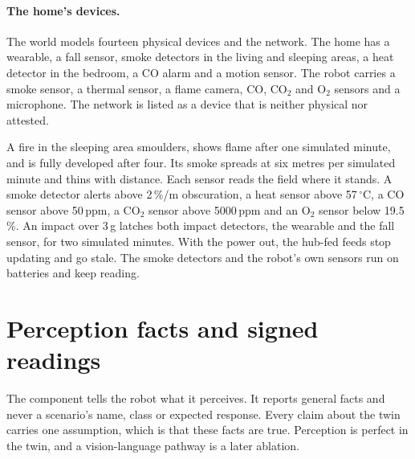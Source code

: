 \paragraph{The home's devices.} The world models fourteen physical devices and the network. The home
has a wearable, a fall sensor, smoke detectors in the living and sleeping areas, a heat detector in
the bedroom, a CO alarm and a motion sensor. The robot carries a smoke sensor, a thermal sensor, a
flame camera, CO, CO$_2$ and O$_2$ sensors and a microphone. The network is listed as a device that is
neither physical nor attested.

A fire in the sleeping area smoulders, shows flame after one simulated minute, and is fully developed
after four. Its smoke spreads at six metres per simulated minute and thins with distance. Each sensor
reads the field where it stands. A smoke detector alerts above 2\,\%/m obscuration, a heat sensor
above 57\,$^\circ$C, a CO sensor above 50\,ppm, a CO$_2$ sensor above 5000\,ppm and an O$_2$ sensor
below 19.5\,\%. An impact over 3\,g latches both impact detectors, the wearable and the fall sensor,
for two simulated minutes. With the power out, the hub-fed feeds stop updating and go stale. The
smoke detectors and the robot's own sensors run on batteries and keep reading.

\section{Perception facts and signed readings}\label{sec:home-perception}

The component  tells the robot what it perceives. It reports general facts and
never a scenario's name, class or expected response. Every claim about the twin carries one
assumption, which is that these facts are true. Perception is perfect in the twin, and a
vision-language pathway is a later ablation.

